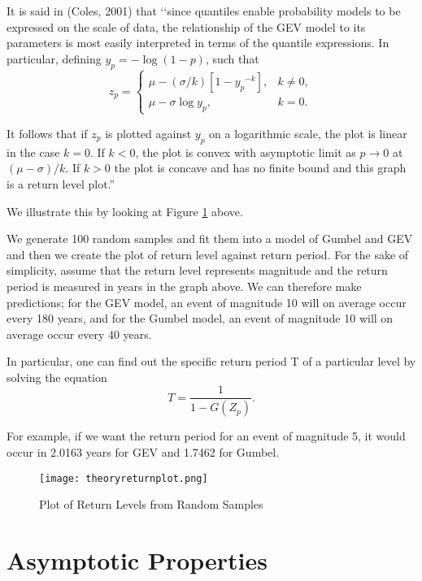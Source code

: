 \documentclass{article}
\begin{document}
It is said in (Coles, 2001) that  ‘‘since quantiles enable probability models to be expressed on the scale of data, the relationship of the GEV model to its parameters is most easily interpreted in terms of the quantile expressions. In particular, defining $y_p=-\log(1-p)$, such that
$$z_p=
\begin{cases} \mu-(\sigma/k)[1-{y_p}^{-k}], & k\ne 0,\\
\mu-\sigma \log y_p, & k=0.
\end{cases}
$$

It follows that if $z_p$ is plotted against $y_p$ on a logarithmic scale, the plot is linear in the case $k=0$. If $k<0$, the plot is convex with asymptotic limit as $p \to 0$ at $(\mu-\sigma)/k$. If $k>0$ the plot is concave and has no finite bound and this graph is a return level plot.''


We illustrate this by looking at Figure \ref{fig:sec2returnplot} above.

We generate 100 random samples and fit them into a model of Gumbel and GEV and then we create the plot of return level against return period. For the sake of simplicity, assume that the return level represents magnitude and the return period is measured in years in the graph above. We can therefore make predictions; for the GEV model, an event of magnitude 10 will on average occur every 180 years, and for the Gumbel model, an event of magnitude 10 will on average occur every 40 years. 

In particular, one can find out the specific return period T of a particular level by solving the equation
$$T=\frac{1}{1-G(Z_p)}.$$

For example, if we want the return period for an event of magnitude 5, it would occur in 2.0163 years for GEV and 1.7462 for Gumbel.

\begin{figure}
    \centering
    \texttt{[image: theoryreturnplot.png]}
    \vspace{-10mm}
    \caption{Plot of Return Levels from Random Samples}
    \label{fig:sec2returnplot}
\end{figure}

\newpage
\section{Asymptotic Properties}
\end{document}
